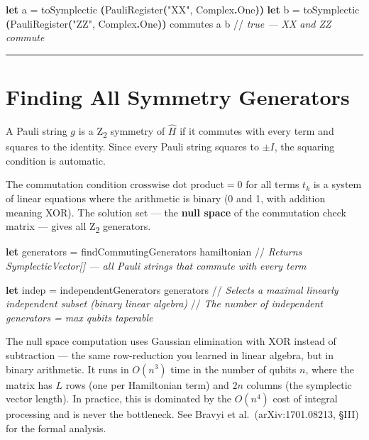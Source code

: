 \documentclass[
  11pt,
  oneside]{book}
\newenvironment{Shaded}{\begin{snugshade}}{\end{snugshade}}
\newcommand{\CommentTok}[1]{\textcolor[rgb]{0.56,0.35,0.01}{\textit{#1}}}
\newcommand{\KeywordTok}[1]{\textcolor[rgb]{0.13,0.29,0.53}{\textbf{#1}}}
\newcommand{\NormalTok}[1]{#1}
\newcommand{\OperatorTok}[1]{\textcolor[rgb]{0.81,0.36,0.00}{\textbf{#1}}}
\newcommand{\StringTok}[1]{\textcolor[rgb]{0.31,0.60,0.02}{#1}}
\begin{document}
\begin{Shaded}
\begin{Highlighting}[]
\KeywordTok{let}\NormalTok{ a = toSymplectic }\OperatorTok{(}\NormalTok{PauliRegister}\OperatorTok{(}\StringTok{"XX"}\NormalTok{, Complex}\KeywordTok{.}\NormalTok{One}\OperatorTok{))}
\KeywordTok{let}\NormalTok{ b = toSymplectic }\OperatorTok{(}\NormalTok{PauliRegister}\OperatorTok{(}\StringTok{"ZZ"}\NormalTok{, Complex}\KeywordTok{.}\NormalTok{One}\OperatorTok{))}
\NormalTok{commutes a b  //}\CommentTok{ true --- XX and ZZ commute}
\end{Highlighting}
\end{Shaded}

\begin{center}\rule{0.5\linewidth}{0.5pt}\end{center}

\section{Finding All Symmetry
Generators}\label{finding-all-symmetry-generators}

A Pauli string \(g\) is a Z\textsubscript{2} symmetry of \(\hat{H}\) if it commutes with
every term and squares to the identity. Since every Pauli string squares
to \(\pm I\), the squaring condition is automatic.

The commutation condition \(\text{crosswise dot product} = 0\) for all
terms \(t_k\) is a system of linear equations where the arithmetic is
binary (0 and 1, with addition meaning XOR). The solution set --- the
\textbf{null space} of the commutation check matrix --- gives all Z\textsubscript{2}
generators.

\begin{Shaded}
\begin{Highlighting}[]
\KeywordTok{let}\NormalTok{ generators = findCommutingGenerators hamiltonian}
\NormalTok{//}\CommentTok{ Returns SymplecticVector[] --- all Pauli strings that commute with every term}

\KeywordTok{let}\NormalTok{ indep = independentGenerators generators}
\NormalTok{//}\CommentTok{ Selects a maximal linearly independent subset (binary linear algebra)}
\NormalTok{//}\CommentTok{ The number of independent generators = max qubits taperable}
\end{Highlighting}
\end{Shaded}

The null space computation uses Gaussian elimination with XOR instead of
subtraction --- the same row-reduction you learned in linear algebra,
but in binary arithmetic. It runs in \(O(n^3)\) time in the number of
qubits \(n\), where the matrix has \(L\) rows (one per Hamiltonian term)
and \(2n\) columns (the symplectic vector length). In practice, this is
dominated by the \(O(n^4)\) cost of integral processing and is never the
bottleneck. See Bravyi et al.~(arXiv:1701.08213, §III) for the formal
analysis.
\end{document}
